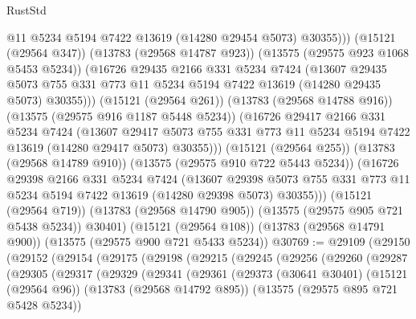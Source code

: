 \begin{lexlean}{RustStd}
\begin{coremodule}
                  @11
                  @5234
                  @5194
                  @7422
                  @13619
                  (@14280 @29454 @5073)
                  @30355)))
            (@15121 (@29564 @347))
            (@13783 (@29568 @14787 @923))
            (@13575 (@29575 @923 @1068 @5453 @5234))
            (@16726
              @29435
              @2166
              @331
              @5234
              @7424
              (@13607
                @29435
                @5073
                @755
                @331
                @773
                @11
                @5234
                @5194
                @7422
                @13619
                (@14280 @29435 @5073)
                @30355)))
          (@15121 (@29564 @261))
          (@13783 (@29568 @14788 @916))
          (@13575 (@29575 @916 @1187 @5448 @5234))
          (@16726
            @29417
            @2166
            @331
            @5234
            @7424
            (@13607
              @29417
              @5073
              @755
              @331
              @773
              @11
              @5234
              @5194
              @7422
              @13619
              (@14280 @29417 @5073)
              @30355)))
        (@15121 (@29564 @255))
        (@13783 (@29568 @14789 @910))
        (@13575 (@29575 @910 @722 @5443 @5234))
        (@16726
          @29398
          @2166
          @331
          @5234
          @7424
          (@13607
            @29398
            @5073
            @755
            @331
            @773
            @11
            @5234
            @5194
            @7422
            @13619
            (@14280 @29398 @5073)
            @30355)))
      (@15121 (@29564 @719))
      (@13783 (@29568 @14790 @905))
      (@13575 (@29575 @905 @721 @5438 @5234))
      @30401)
    (@15121 (@29564 @108))
    (@13783 (@29568 @14791 @900))
    (@13575 (@29575 @900 @721 @5433 @5234))
@30769 := @29109
    (@29150
      (@29152
        (@29154
          (@29175
            (@29198
              (@29215
                (@29245
                  (@29256
                    (@29260
                      (@29287
                        (@29305
                          (@29317
                            (@29329
                              (@29341
                                (@29361
                                  (@29373
                                    (@30641 @30401)
                                    (@15121 (@29564 @96))
                                    (@13783 (@29568 @14792 @895))
                                    (@13575 (@29575 @895 @721 @5428 @5234))

\end{coremodule}
\end{lexlean}
